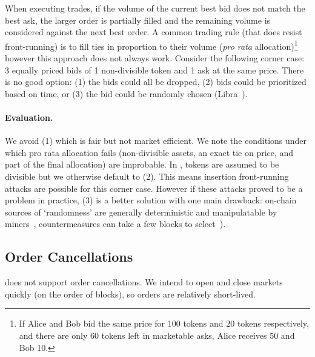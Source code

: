 When executing trades, if the volume of the current best bid does not match the best ask, the larger order is partially filled and the remaining volume is considered against the next best order. A common trading rule (that does resist front-running) is to fill ties in proportion to their volume (\ie \textit{pro rata} allocation)\footnote{If Alice and Bob bid the same price for 100 tokens and 20 tokens respectively, and there are only 60 tokens left in marketable asks, Alice receives 50 and Bob 10.} however this approach does not always work. Consider the following corner case: 3 equally priced bids of 1 non-divisible token and 1 ask at the same price. There is no good option: (1) the bids could all be dropped, (2) bids could be prioritized based on time, or (3) the bid could be randomly chosen (\cf Libra~\cite{mavroudis2019libra}). 

\paragraph{Evaluation.} We avoid (1) which is fair but not market efficient. We note the conditions under which pro rata allocation fails (\ie non-divisible assets, an exact tie on price, and part of the final allocation) are improbable. In \cm, tokens are assumed to be divisible but we otherwise default to (2). This means insertion front-running attacks are possible for this corner case. However if these attacks proved to be a problem in practice, (3) is a better solution with one main drawback: on-chain sources of `randomness' are generally deterministic and manipulatable by miners~\cite{bonneau2015random,buenz2017proofs}, countermeasures can take a few blocks to select~\cite{boneh2018verifiable}).


\subsection{Order Cancellations}

\cm does not support order cancellations. We intend to open and close markets quickly (on the order of blocks), so orders are relatively short-lived. 

